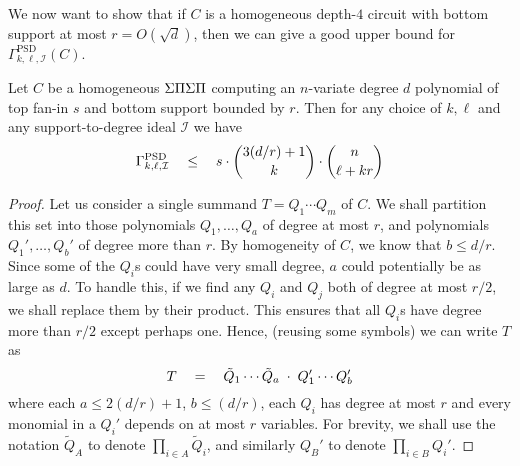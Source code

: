 We now want to show that if $C$ is a homogeneous depth-$4$ circuit with bottom support at most $r = O(\sqrt{d})$, then we can give a good upper bound for $\Gamma^{\mathrm{PSD}}_{k,\ell,\mathcal{I}}(C)$. 

\begin{lemma}\label{lem:PSPD-I-upperbound} Let $C$ be a homogeneous $\Sigma\Pi\Sigma\Pi$ computing an $n$-variate degree $d$ polynomial of top fan-in $s$ and bottom support bounded by $r$. Then for any choice of $k,\ell$ and any support-to-degree ideal $\mathcal{I}$ we have
\[
\Gamma^{\mathrm{PSD}}_{k,\ell,\mathcal{I}} \quad \leq \quad s \cdot \binom{3(d/r) + 1}{k} \cdot \binom{n}{\ell + kr}
\]
\end{lemma}
\begin{proof}
  Let us consider a single summand $T = Q_1 \cdots Q_m$ of $C$.
We shall partition this set into those polynomials $Q_1,\ldots, Q_a$ of degree at most $r$, and polynomials $Q_1',\ldots, Q_b'$ of degree more than $r$. By homogeneity of $C$, we know that $b \leq d/r$. Since some of the $Q_i$s could have very small degree, $a$ could potentially be as large as $d$. To handle this, if we find any $Q_i$ and $Q_j$ both of degree at most $r/2$, we shall replace them by their product. This ensures that all $Q_i$s have degree more than $r/2$ except perhaps one. Hence, (reusing some symbols) we can write $T$ as
\[
T \quad = \quad \tilde{Q}_1 \cdots \tilde{Q}_a \;\cdot\; Q_1' \cdots Q_b'
\]
where each $a \leq 2(d/r) + 1$, $b \leq (d/r)$, each $Q_i$ has degree at most $r$ and every monomial in a $Q_i'$ depends on at most $r$ variables. For brevity, we shall use the notation $\tilde{Q}_A$ to denote $\prod_{i\in A} \tilde{Q}_i$, and similarly $Q_B'$ to denote $\prod_{i\in B} Q_i'$. 


\end{proof}
